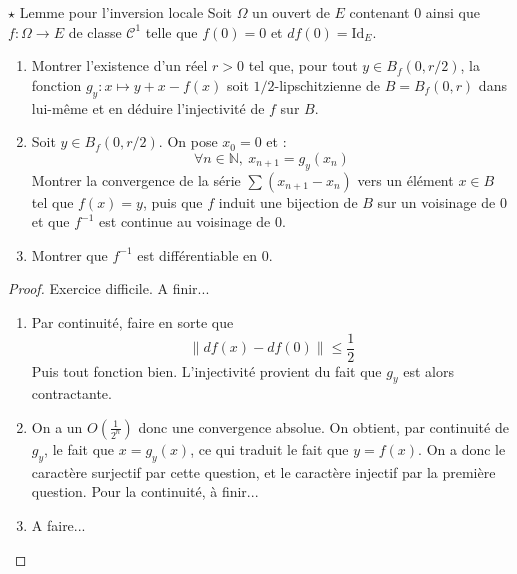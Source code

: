 \documentclass[french,a4paper]{article}
\newcommand{\N}{\mathbb{N}}
\newcommand{\inv}{^{-1}}
\theoremstyle{plain}
\theoremstyle{definition}
\theoremstyle{remark}
\begin{document}
\begin{ex}[Moulin.CD.17]{$\star$ Lemme pour l'inversion locale}
	Soit $\Omega$ un ouvert de $E$ contenant $0$ ainsi que $f:\Omega\to E$ de classe $\mathcal{C}^1$ telle que $f(0)=0$ et $df(0)=\text{Id}_E$.
	\begin{enumerate}
		\item Montrer l'existence d'un réel $r>0$ tel que, pour tout $y\in B_f(0,r/2)$, la fonction $g_y:x\mapsto y+x-f(x)$ soit $1/2$-lipschitzienne de $B=B_f(0,r)$ dans lui-même et en déduire l'injectivité de $f$ sur $B$.
		\item Soit $y\in B_f(0,r/2)$. On pose $x_0=0$ et : $$\forall n\in\N,\ x_{n+1}=g_y(x_n)$$ Montrer la convergence de la série $\sum(x_{n+1}-x_n)$ vers un élément $x\in B$ tel que $f(x)=y$, puis que $f$ induit une bijection de $B$ sur un voisinage de $0$ et que $f\inv$ est continue au voisinage de $0$.
		\item Montrer que $f\inv$ est différentiable en $0$.
	\end{enumerate}
\end{ex}
\begin{proof}
	Exercice difficile. A finir...
	\begin{enumerate}
		\item Par continuité, faire en sorte que $$\lVert df(x)-df(0)\rVert\leqslant\frac{1}{2}$$ Puis tout fonction bien. L'injectivité provient du fait que $g_y$ est alors contractante.
		\item On a un $O\left(\displaystyle\frac{1}{2^n}\right)$ donc une convergence absolue. On obtient, par continuité de $g_y$, le fait que $x=g_y(x)$, ce qui traduit le fait que $y=f(x)$. On a donc le caractère surjectif par cette question, et le caractère injectif par la première question. Pour la continuité, à finir...
		\item A faire...
	\end{enumerate}
\end{proof}
\end{document}

